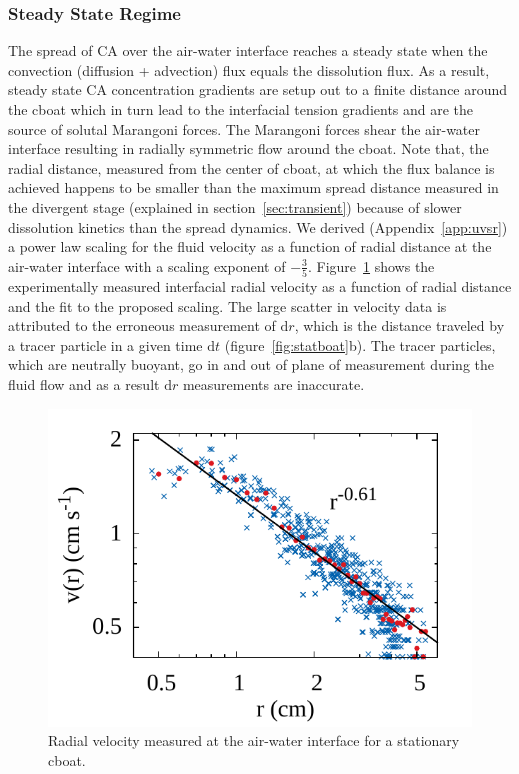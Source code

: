 \documentclass[journal=langd5, manuscript=article, layout=twocolumn]{achemso}
\newcommand{\td}[1]{\mathrm{d}#1}
\begin{document}
\subsubsection{Steady State Regime}
\label{sec:steady}
The spread of CA over the air-water interface reaches a steady state when the convection (diffusion + advection) flux equals the dissolution flux. As a result, steady state CA concentration gradients are setup out to a finite distance around the cboat which in turn lead to the interfacial tension gradients and are the source of solutal Marangoni forces. The Marangoni forces shear the air-water interface resulting in radially symmetric flow around the cboat. Note that, the radial distance, measured from the center of cboat, at which the flux balance is achieved happens to be smaller than the maximum spread distance measured in the divergent stage (explained in section~\ref{sec:transient}) because of slower dissolution kinetics than the spread dynamics. We derived (Appendix~\ref{app:uvsr}) a power law scaling for the fluid velocity as a function of radial distance at the air-water interface with a scaling exponent of $-\frac{3}{5}$. Figure~\ref{fig:radvel} shows the experimentally measured interfacial radial velocity as a function of radial distance and the fit to the proposed scaling. The large scatter in velocity data is attributed to the erroneous measurement of $\td{r}$, which is the distance traveled by a tracer particle in a given time $\td{t}$ (figure~\ref{fig:statboat}b). The tracer particles, which are neutrally buoyant, go in and out of plane of measurement during the fluid flow and as a result $\td{r}$ measurements are inaccurate.
\begin{figure}[ht] 
    \begin{center}
       \includegraphics[width=\linewidth]{urvsr_steady.pdf}
    \end{center}
    \caption{Radial velocity measured at the air-water interface for a stationary cboat.}
    \label{fig:radvel}
\end{figure}
\end{document}
